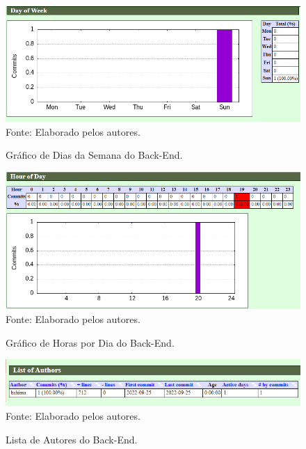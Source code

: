 \documentclass[
    12pt,               %
    openright,          %
    oneside,
    a4paper,            %
    BIBLATEX,           %
    TODO,               %
    english,            %
    brazil              %
    ]{ifsp-spo-inf-ctds}
\begin{document}
            \begin{figure}[H]
                \centering
                \caption{Gráfico de Dias da Semana do Back-End.}
                \includegraphics[width=1 \textwidth]{Gitstats/back-end/DiasBack.png}
                {\footnotesize Fonte: Elaborado pelos autores.}
                \label{fig:diasBack}
            \end{figure}
            
            \begin{figure}[H]
                \centering
                \caption{Gráfico de Horas por Dia do Back-End.}
                \includegraphics[width=1 \textwidth]{Gitstats/back-end/HorasBack.png}
                {\footnotesize Fonte: Elaborado pelos autores.}
                \label{fig:HorasBack}
            \end{figure}
            
            \begin{figure}[H]
                \centering
                \caption{Lista de Autores do Back-End.}
                \includegraphics[width=1 \textwidth]{Gitstats/back-end/AutorBack.png}
                {\footnotesize Fonte: Elaborado pelos autores.}
                \label{fig:AutorBack}
            \end{figure}
            
\end{document}
